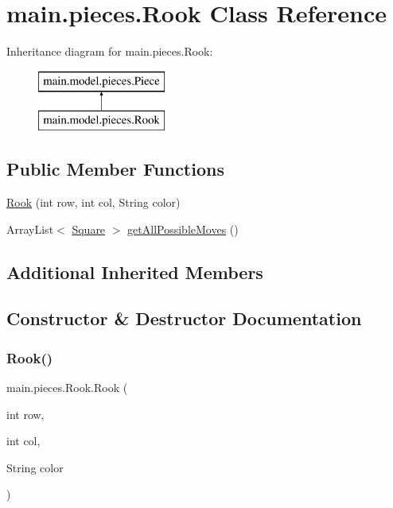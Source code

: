 \hypertarget{classmain_1_1pieces_1_1_rook}{}\section{main.\+pieces.\+Rook Class Reference}
\label{classmain_1_1pieces_1_1_rook}
Inheritance diagram for main.\+pieces.\+Rook\+:\begin{figure}[H]
\begin{center}
\leavevmode
\includegraphics[height=2.000000cm]{classmain_1_1pieces_1_1_rook}
\end{center}
\end{figure}
\subsection*{Public Member Functions}
\begin{DoxyCompactItemize}
\item 
\hyperlink{classmain_1_1pieces_1_1_rook_af933881ca2110cf9c70cfa8f398a42dd}{Rook} (int row, int col, String color)
\item 
Array\+List$<$ \hyperlink{classmain_1_1_square}{Square} $>$ \hyperlink{classmain_1_1pieces_1_1_rook_a5f7c1bc6f8aba1f915d2274601232218}{get\+All\+Possible\+Moves} ()
\end{DoxyCompactItemize}
\subsection*{Additional Inherited Members}


\subsection{Constructor \& Destructor Documentation}
\mbox{\label{classmain_1_1pieces_1_1_rook_af933881ca2110cf9c70cfa8f398a42dd}} 
\subsubsection{\texorpdfstring{Rook()}{Rook()}}
{\footnotesize\ttfamily main.\+pieces.\+Rook.\+Rook (\begin{DoxyParamCaption}\item[{int}]{row,  }\item[{int}]{col,  }\item[{String}]{color }\end{DoxyParamCaption})\hspace{0.3cm}{\ttfamily [inline]}}


